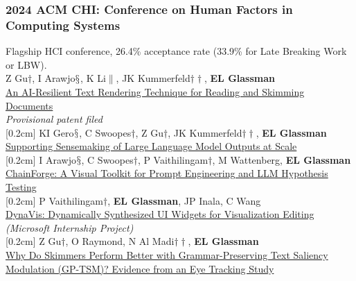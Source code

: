 \documentclass[10pt, a4paper]{article}
\newcommand{\years}[1]{\marginnote{\normalsize #1}}
\begin{document}

\subsubsection*{2024 ACM \textbf{CHI}: Conference on Human Factors in Computing Systems}
Flagship HCI conference, 26.4\% acceptance rate (33.9\% for Late Breaking Work or LBW).\\

\years{\textbf{C35}} Z Gu$\dagger$, I Arawjo$\mathsection$, K Li$\|$, JK Kummerfeld$\dagger\dagger$, \textbf{EL Glassman}\\ \href{https://glassmanlab.seas.harvard.edu/papers/gptsm.pdf}{An AI-Resilient Text Rendering Technique for Reading and Skimming Documents}\\
\textit{Provisional patent filed}\\
[0.2cm]
\years{\textbf{C34}} KI Gero$\mathsection$, C Swoopes$\dagger$, Z Gu$\dagger$, JK Kummerfeld$\dagger\dagger$, \textbf{EL Glassman}\\ \href{https://glassmanlab.seas.harvard.edu/papers/mesotext.pdf}{Supporting Sensemaking of Large Language Model Outputs at Scale}\\
[0.2cm]
\years{\textbf{C33}} I Arawjo$\mathsection$, C Swoopes$\dagger$, P Vaithilingam$\dagger$, M Wattenberg, \textbf{EL Glassman}\\ \href{https://glassmanlab.seas.harvard.edu/papers/chainforge.pdf}{ChainForge: A Visual Toolkit for Prompt Engineering and LLM Hypothesis Testing}\\
[0.2cm]
\years{\textbf{C32}} P Vaithilingam$\dagger$, \textbf{EL Glassman}, JP Inala, C Wang\\ \href{https://glassmanlab.seas.harvard.edu/papers/dynavis.pdf}{DynaVis: Dynamically Synthesized UI Widgets for Visualization Editing}\\
\textit{(Microsoft Internship Project)}\\
[0.2cm]
\years{\textbf{C31} LBW}Z Gu$\dagger$, O Raymond, N Al Madi$\dagger\dagger$, \textbf{EL Glassman}\\
\href{https://glassmanlab.seas.harvard.edu/papers/gptsm_eye_lbw.pdf}{Why Do Skimmers Perform Better with Grammar-Preserving Text Saliency Modulation (GP-TSM)? Evidence from an Eye Tracking Study}
\end{document}
